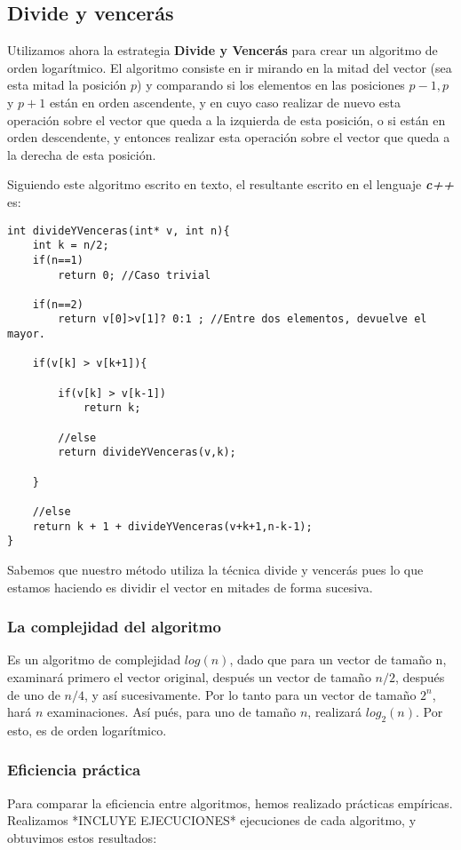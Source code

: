 \documentclass[a4paper, 11pt]{article}
\begin{document}
\subsection{Divide y vencerás}
Utilizamos ahora la estrategia \textbf{Divide y Vencerás} para crear un algoritmo de orden logarítmico. El algoritmo consiste en ir mirando en la mitad del vector (sea esta mitad la posición $p$) y comparando si los elementos en las posiciones $p-1,p$ y $p+1$ están en orden ascendente, y en cuyo caso realizar de nuevo esta operación sobre el vector que queda a la izquierda de esta posición, o si están en orden descendente, y entonces realizar esta operación sobre el vector que queda a la derecha de esta posición.

Siguiendo este algoritmo escrito en texto, el resultante escrito en el lenguaje \emph{\textbf{c++}} es:
\begin{lstlisting}
int divideYVenceras(int* v, int n){
	int k = n/2;
	if(n==1)
		return 0; //Caso trivial
	
	if(n==2)
		return v[0]>v[1]? 0:1 ; //Entre dos elementos, devuelve el mayor.

	if(v[k] > v[k+1]){

		if(v[k] > v[k-1]) 
			return k;

		//else
		return divideYVenceras(v,k);

	}

	//else
	return k + 1 + divideYVenceras(v+k+1,n-k-1);
}

\end{lstlisting}

Sabemos que nuestro método utiliza la técnica divide y vencerás pues lo que estamos haciendo es dividir el vector en mitades de forma sucesiva.

\subsubsection{La complejidad del algoritmo}
Es un algoritmo de complejidad $log(n)$, dado que para un vector de tamaño n, examinará primero el vector original, después un vector de tamaño $n/2$, después de uno de $n/4$, y así sucesivamente. Por lo tanto para un vector de tamaño $2^n$, hará $n$ examinaciones. Así pués, para uno de tamaño $n$, realizará $log_2(n)$. Por esto, es de orden logarítmico.

\subsubsection{Eficiencia práctica}
Para comparar la eficiencia entre algoritmos, hemos realizado prácticas empíricas. Realizamos *INCLUYE EJECUCIONES* ejecuciones de cada algoritmo, y obtuvimos estos resultados:
\end{document}

